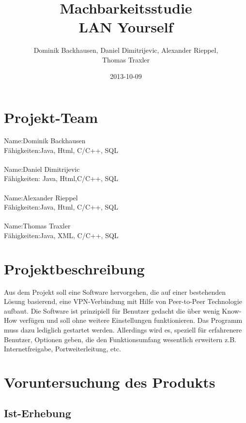 \documentclass[a4paper,12pt]{scrreprt}
\begin{document}
\author{Dominik Backhausen, Daniel Dimitrijevic, Alexander Rieppel,\\ Thomas Traxler}
\title{Machbarkeitsstudie\\ LAN Yourself}
\date{2013-10-09}
\maketitle
\tableofcontents



\chapter{Projekt-Team}
	
	Name:Dominik Backhausen\\
	    Fähigkeiten:Java, Html, C/C++, SQL\\\\
	  	Name:Daniel Dimitrijevic
	\\ 	Fähigkeiten: Java, Html,C/C++, SQL    
	\\
	\\  Name:Alexander Rieppel
	\\
	    Fähigkeiten:Java, Html, C/C++, SQL
	    \\
	    \\
	    Name:Thomas Traxler
	    \\
	    Fähigkeiten:Java, XML, C/C++, SQL
	    \\
\chapter{Projektbeschreibung}

Aus dem Projekt soll eine Software hervorgehen, die auf einer bestehenden Lösung basierend, eine VPN-Verbindung mit Hilfe von Peer-to-Peer Technologie aufbaut. Die Software ist prinzipiell für Benutzer gedacht die über wenig Know-How verfügen und soll ohne weitere Einstellungen funktionieren. Das Programm muss dazu lediglich gestartet werden. Allerdings wird es, speziell für erfahrenere Benutzer, Optionen geben, die den Funktionsumfang wesentlich erweitern z.B. Internetfreigabe, Portweiterleitung, etc.


\chapter{Voruntersuchung des Produkts}
	\section{Ist-Erhebung}
	
\end{document}

